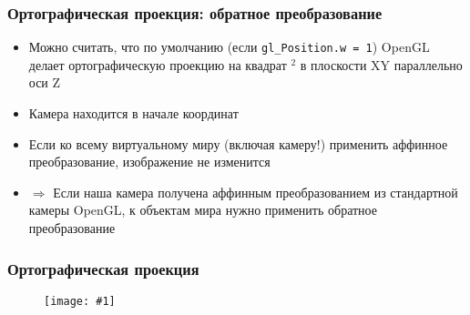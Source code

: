 \documentclass{beamer}
\newcommand{\slideimage}[1]{
  \begin{figure}
    \begin{adjustbox}{width=\textwidth, totalheight=\textheight-2\baselineskip-2\baselineskip,keepaspectratio}
      \texttt{[image: \#1]}
    \end{adjustbox}
  \end{figure}
}
\begin{document}
\begin{frame}[fragile]
\frametitle{Ортографическая проекция: обратное преобразование}
\begin{itemize}
\item Можно считать, что по умолчанию (если \verb|gl_Position.w = 1|) OpenGL делает ортографическую проекцию на квадрат \begin{math}[-1, 1]^2\end{math} в плоскости XY параллельно оси Z
\item Камера находится в начале координат
\pause
\item Если ко всему виртуальному миру (включая камеру!) применить аффинное преобразование, изображение не изменится
\pause
\item \begin{math}\Rightarrow\end{math} Если наша камера получена аффинным преобразованием из стандартной камеры OpenGL, к объектам мира нужно применить обратное преобразование
\end{itemize}
\end{frame}

\begin{frame}[fragile]
\frametitle{Ортографическая проекция}
\slideimage{orthographic.png}
\end{frame}
\end{document}
